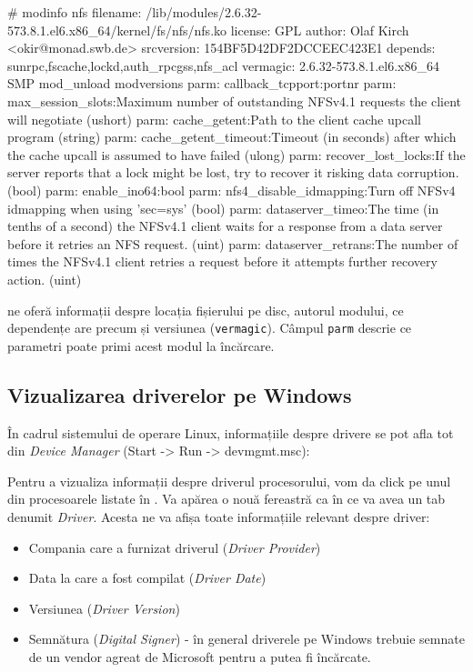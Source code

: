 \begin{screen}
# modinfo nfs
filename:       /lib/modules/2.6.32-573.8.1.el6.x86_64/kernel/fs/nfs/nfs.ko
license:        GPL
author:         Olaf Kirch <okir@monad.swb.de>
srcversion:     154BF5D42DF2DCCEEC423E1
depends:        sunrpc,fscache,lockd,auth_rpcgss,nfs_acl
vermagic:       2.6.32-573.8.1.el6.x86_64 SMP mod_unload modversions
parm:           callback_tcpport:portnr
parm:           max_session_slots:Maximum number of outstanding NFSv4.1 requests the client will negotiate (ushort)
parm:           cache_getent:Path to the client cache upcall program (string)
parm:           cache_getent_timeout:Timeout (in seconds) after which the cache upcall is assumed to have failed (ulong)
parm:           recover_lost_locks:If the server reports that a lock might be lost, try to recover it risking data corruption. (bool)
parm:           enable_ino64:bool
parm:           nfs4_disable_idmapping:Turn off NFSv4 idmapping when using 'sec=sys' (bool)
parm:           dataserver_timeo:The time (in tenths of a second) the NFSv4.1  client  waits for a response from a  data server before it retries an NFS request. (uint)
parm:           dataserver_retrans:The  number of times the NFSv4.1 client retries a request before it attempts further  recovery  action. (uint)
\end{screen}

 ne oferă informații despre locația fișierului pe disc, autorul
modului, ce dependențe are precum și versiunea (\texttt{vermagic}). Câmpul
\texttt{parm} descrie ce parametri poate primi acest modul la încărcare.

\subsection{Vizualizarea driverelor pe Windows}
\label{sec:hardware-virtualizare-windows}

În cadrul sistemului de operare Linux, informațiile despre drivere se pot afla
tot din \textit{Device Manager} (Start -> Run -> devmgmt.msc):

Pentru a vizualiza informații despre driverul procesorului, vom da click pe unul
din procesoarele listate în . Va
apărea o nouă fereastră ca în  ce va avea
un tab denumit \textit{Driver}. Acesta ne va afișa toate informațiile relevant
despre driver:

\begin{itemize}
	\item Compania care a furnizat driverul (\textit{Driver Provider})
	\item Data la care a fost compilat (\textit{Driver Date})
	\item Versiunea (\textit{Driver Version})
	\item Semnătura (\textit{Digital Signer}) - în general driverele pe
		Windows trebuie semnate de un vendor agreat de Microsoft pentru
		a putea fi încărcate.
\end{itemize}

